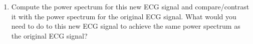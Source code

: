 \begin{enumerate}
\item Compute the power spectrum for this new ECG signal and compare/contrast
it with the power spectrum for the original ECG signal.  What would you need to
do to this new ECG signal to achieve the same power spectrum as the original
ECG signal?  

\end{enumerate}
